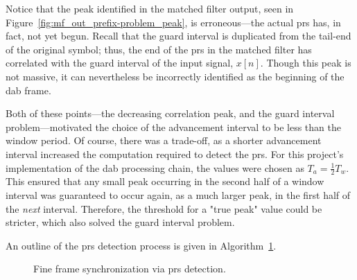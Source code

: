 \documentclass[class=report,11pt,crop=false]{standalone}
\begin{document}
Notice that the peak identified in the matched filter output, seen in Figure~\ref{fig:mf_out_prefix-problem_peak}, is erroneous---the actual \gls{prs} has, in fact, not yet begun. Recall that the guard interval is duplicated from the tail-end of the original symbol; thus, the end of the \gls{prs} in the matched filter has correlated with the guard interval of the input signal, \(x[n]\). Though this peak is not massive, it can nevertheless be incorrectly identified as the beginning of the \gls{dab} frame.

Both of these points---the decreasing correlation peak, and the guard interval problem---motivated the choice of the advancement interval to be less than the window period. Of course, there was a trade-off, as a shorter advancement interval increased the computation required to detect the \gls{prs}. For this project's implementation of the \gls{dab} processing chain, the values were chosen as \(T_a = \frac{1}{2} T_w\). This ensured that any small peak occurring in the second half of a window interval was guaranteed to occur again, as a much larger peak, in the first half of the \emph{next} interval. Therefore, the threshold for a "true peak" value could be stricter, which also solved the guard interval problem.

An outline of the \gls{prs} detection process is given in Algorithm~\ref{alg:prs_detect}.

\begin{figure}[ht]
  \vspace{0.5cm}
  \centering
  \captionsetup{type=figure}
  \begin{minipage}{.75\linewidth}
    \begin{algorithm}[H]
      \caption{Fine frame synchronization via \gls{prs} detection. \label{alg:prs_detect}}

      \DontPrintSemicolon
      \SetAlgoLined


      \BlankLine
      \vspace{0.5cm}
    \end{algorithm}
  \end{minipage}
\end{figure}
\end{document}
